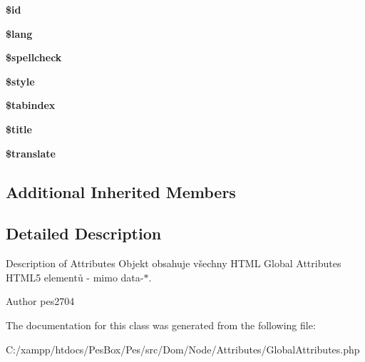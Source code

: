 \begin{DoxyCompactItemize}
\item 
\mbox{\label{class_pes_1_1_dom_1_1_node_1_1_attributes_1_1_global_attributes_ae97941710d863131c700f069b109991e}} 
{\bfseries \$id}
\item 
\mbox{\label{class_pes_1_1_dom_1_1_node_1_1_attributes_1_1_global_attributes_a7714b111b644017933931ec69a154102}} 
{\bfseries \$lang}
\item 
\mbox{\label{class_pes_1_1_dom_1_1_node_1_1_attributes_1_1_global_attributes_ae8978ae58728bcb8d03abfe57d136356}} 
{\bfseries \$spellcheck}
\item 
\mbox{\label{class_pes_1_1_dom_1_1_node_1_1_attributes_1_1_global_attributes_a4b16ebd3ba5d6cd79dd64e240aec4a58}} 
{\bfseries \$style}
\item 
\mbox{\label{class_pes_1_1_dom_1_1_node_1_1_attributes_1_1_global_attributes_adcac1cf10234ff67bd13190a0f188dda}} 
{\bfseries \$tabindex}
\item 
\mbox{\label{class_pes_1_1_dom_1_1_node_1_1_attributes_1_1_global_attributes_ada57e7bb7c152edad18fe2f166188691}} 
{\bfseries \$title}
\item 
\mbox{\label{class_pes_1_1_dom_1_1_node_1_1_attributes_1_1_global_attributes_aacfbb6b571f9e2e3db05247d82cae1b0}} 
{\bfseries \$translate}
\end{DoxyCompactItemize}
\subsection*{Additional Inherited Members}


\subsection{Detailed Description}
Description of Attributes Objekt obsahuje všechny H\+T\+ML Global Attributes H\+T\+M\+L5 elementů -\/ mimo data-\/$\ast$.

\begin{DoxyAuthor}{Author}
pes2704 
\end{DoxyAuthor}


The documentation for this class was generated from the following file\+:\begin{DoxyCompactItemize}
\item 
C\+:/xampp/htdocs/\+Pes\+Box/\+Pes/src/\+Dom/\+Node/\+Attributes/Global\+Attributes.\+php\end{DoxyCompactItemize}
